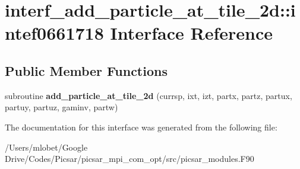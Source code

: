\hypertarget{interfaceinterf__add__particle__at__tile__2d_1_1intef0661718}{}\section{interf\+\_\+add\+\_\+particle\+\_\+at\+\_\+tile\+\_\+2d\+:\+:intef0661718 Interface Reference}
\label{interfaceinterf__add__particle__at__tile__2d_1_1intef0661718}
\subsection*{Public Member Functions}
\begin{DoxyCompactItemize}
\item 
subroutine {\bfseries add\+\_\+particle\+\_\+at\+\_\+tile\+\_\+2d} (currsp, ixt, izt, partx, partz, partux, partuy, partuz, gaminv, partw)\hypertarget{interfaceinterf__add__particle__at__tile__2d_1_1intef0661718_a3996c01d6da582127ad9dc79ae836803}{}\label{interfaceinterf__add__particle__at__tile__2d_1_1intef0661718_a3996c01d6da582127ad9dc79ae836803}

\end{DoxyCompactItemize}


The documentation for this interface was generated from the following file\+:\begin{DoxyCompactItemize}
\item 
/\+Users/mlobet/\+Google Drive/\+Codes/\+Picsar/picsar\+\_\+mpi\+\_\+com\+\_\+opt/src/picsar\+\_\+modules.\+F90\end{DoxyCompactItemize}
